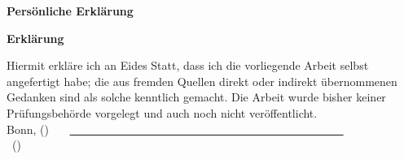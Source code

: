 \thispagestyle{empty}
\begin{center}
\huge \textbf{Persönliche Erklärung}
\end{center}
\vspace*{3cm}

\begin{center}
\huge \textbf{Erklärung}
\end{center}
\vspace{2cm}
Hiermit erkläre ich an Eides Statt, dass ich die vorliegende Arbeit selbst angefertigt habe; die aus fremden Quellen direkt oder indirekt übernommenen Gedanken sind als solche kenntlich gemacht.
Die Arbeit wurde bisher keiner Prüfungsbehörde vorgelegt und auch noch nicht veröffentlicht.
\vspace*{3cm}
\\
Bonn, (\ThesisPubDate) \ \ \ \underline{\ \ \ \ \ \ \ \ \ \ \ \ \ \ \ \ \ \ \ \ \ \ \ \ \ \ \ \ \ \ \ \ \ \ \ \ \ \ \ \ \ \ \ \ \ \ \ \ }\\
\hspace*{4cm} {\ (\ThesisAuthor)}